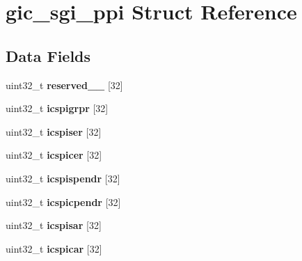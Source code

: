\hypertarget{structgic__sgi__ppi}{}\section{gic\+\_\+sgi\+\_\+ppi Struct Reference}
\label{structgic__sgi__ppi}
\subsection*{Data Fields}
\begin{DoxyCompactItemize}
\item 
\mbox{\label{structgic__sgi__ppi_a9e904042ea8f2e16bbc1062ce96998be}} 
uint32\+\_\+t {\bfseries reserved\+\_\+\_} \mbox{[}32\mbox{]}
\item 
\mbox{\label{structgic__sgi__ppi_a9d7e6c6cc7ad621a1456d9198e02869e}} 
uint32\+\_\+t {\bfseries icspigrpr} \mbox{[}32\mbox{]}
\item 
\mbox{\label{structgic__sgi__ppi_ae26de8ed99a8037be242a8bec2991d0e}} 
uint32\+\_\+t {\bfseries icspiser} \mbox{[}32\mbox{]}
\item 
\mbox{\label{structgic__sgi__ppi_a39ab5c6f0d38e1f27f6c03a7c411cdd1}} 
uint32\+\_\+t {\bfseries icspicer} \mbox{[}32\mbox{]}
\item 
\mbox{\label{structgic__sgi__ppi_afb65ae5348155a6ef95fd30598a9c946}} 
uint32\+\_\+t {\bfseries icspispendr} \mbox{[}32\mbox{]}
\item 
\mbox{\label{structgic__sgi__ppi_ae771721a12defcab9034141440290750}} 
uint32\+\_\+t {\bfseries icspicpendr} \mbox{[}32\mbox{]}
\item 
\mbox{\label{structgic__sgi__ppi_a9fdf12d49cb417c086bb6f8def9fa34d}} 
uint32\+\_\+t {\bfseries icspisar} \mbox{[}32\mbox{]}
\item 
\mbox{\label{structgic__sgi__ppi_a2513162f1bf9f35cb97e519a728b8162}} 
uint32\+\_\+t {\bfseries icspicar} \mbox{[}32\mbox{]}
\item 
\mbox{\label{structgic__sgi__ppi_afb129453e1fa36bb104a255db4a1856f}} 

\end{DoxyCompactItemize}
